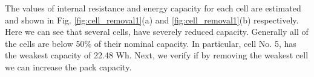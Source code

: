\documentclass[10pt,twocolumn]{IEEEtran}
\begin{document}
The  values of  internal resistance and energy capacity for each cell are estimated and shown in Fig. \ref{fig:cell_removal1}(a) and \ref{fig:cell_removal1}(b) respectively.
Here we can see that several cells, have severely reduced capacity. 
Generally all of the cells are below 50\%  of their nominal capacity.
In particular, cell No. 5, has the weakest capacity of 22.48 Wh. 
Next, we verify if by removing the weakest cell we can increase the pack capacity.


%
%
  
\end{document}
